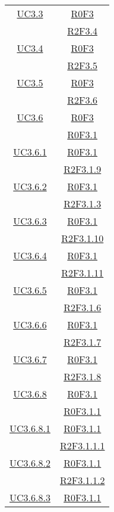 \begin{longtable}{|c|c|}
\hline
\hyperlink{UC3.3}{UC3.3} & \hyperlink{R0F3}{R0F3}\\
& \hyperlink{R2F3.4}{R2F3.4}\\
\hline
\hyperlink{UC3.4}{UC3.4} & \hyperlink{R0F3}{R0F3}\\
& \hyperlink{R2F3.5}{R2F3.5}\\
\hline
\hyperlink{UC3.5}{UC3.5} & \hyperlink{R0F3}{R0F3}\\
& \hyperlink{R2F3.6}{R2F3.6}\\
\hline
\hyperlink{UC3.6}{UC3.6} & \hyperlink{R0F3}{R0F3}\\
& \hyperlink{R0F3.1}{R0F3.1}\\
\hline
\hyperlink{UC3.6.1}{UC3.6.1} & \hyperlink{R0F3.1}{R0F3.1}\\
& \hyperlink{R2F3.1.9}{R2F3.1.9}\\
\hline
\hyperlink{UC3.6.2}{UC3.6.2} & \hyperlink{R0F3.1}{R0F3.1}\\
& \hyperlink{R2F3.1.3}{R2F3.1.3}\\
\hline
\hyperlink{UC3.6.3}{UC3.6.3} & \hyperlink{R0F3.1}{R0F3.1}\\
& \hyperlink{R2F3.1.10}{R2F3.1.10}\\
\hline
\hyperlink{UC3.6.4}{UC3.6.4} & \hyperlink{R0F3.1}{R0F3.1}\\
& \hyperlink{R2F3.1.11}{R2F3.1.11}\\
\hline
\hyperlink{UC3.6.5}{UC3.6.5} & \hyperlink{R0F3.1}{R0F3.1}\\
& \hyperlink{R2F3.1.6}{R2F3.1.6}\\
\hline
\hyperlink{UC3.6.6}{UC3.6.6} & \hyperlink{R0F3.1}{R0F3.1}\\
& \hyperlink{R2F3.1.7}{R2F3.1.7}\\
\hline
\hyperlink{UC3.6.7}{UC3.6.7} & \hyperlink{R0F3.1}{R0F3.1}\\
& \hyperlink{R2F3.1.8}{R2F3.1.8}\\
\hline
\hyperlink{UC3.6.8}{UC3.6.8} & \hyperlink{R0F3.1}{R0F3.1}\\
& \hyperlink{R0F3.1.1}{R0F3.1.1}\\
\hline
\hyperlink{UC3.6.8.1}{UC3.6.8.1} & \hyperlink{R0F3.1.1}{R0F3.1.1}\\
& \hyperlink{R2F3.1.1.1}{R2F3.1.1.1}\\
\hline
\hyperlink{UC3.6.8.2}{UC3.6.8.2} & \hyperlink{R0F3.1.1}{R0F3.1.1}\\
& \hyperlink{R2F3.1.1.2}{R2F3.1.1.2}\\
\hline
\hyperlink{UC3.6.8.3}{UC3.6.8.3} & \hyperlink{R0F3.1.1}{R0F3.1.1}\\

\end{longtable}
